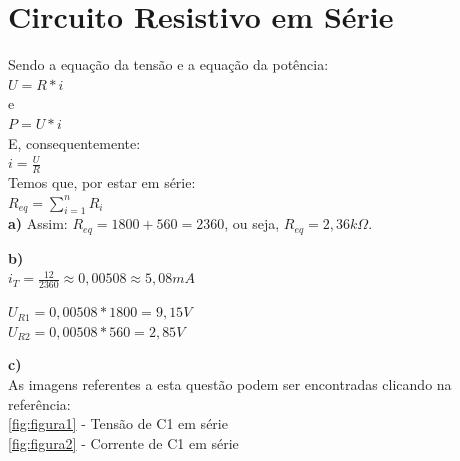 \documentclass[
		12pt, %
		oneside, %
		a4paper, %
		article, %
		chapter=TITLE, %
		section=TITLE, %
		subsection=TITLE, %
		english, %
		spanish, %
		brazil %
]{abntex2} %
\numberwithin{equation}{section}
\numberwithin{figure}{section}
\numberwithin{table}{section}
\begin{document}

	\frenchspacing %



	\imprimircapa

	\imprimirfolhaderosto* %

	\textual

	\chapter{Circuito Resistivo em Série}

	\flushleft
	Sendo a equação da tensão e a equação da potência: \\
	\center
	$U = R*i$ \\
	e \\
	$P = U*i$ \\
	\flushleft
	E, consequentemente: \\
	\center
	$i = \frac{U}{R}$ \\
	\flushleft
	Temos que, por estar em série: \\
	\center
	$R_{eq} = \sum_{i=1}^{n} R_i$ \\


	\flushleft
	\textbf{a)} Assim: $R_{eq} = 1800 + 560 = 2360$, ou seja, $R_{eq} = 2,36 k\Omega$.
	\linebreak

	\textbf{b)} \\
	$i_T = \frac{12}{2360} \approx 0,00508  \approx 5,08 mA$

	$U_{R1} = 0,00508 * 1800 = 9,15V$ \\
	$U_{R2} = 0,00508 * 560 = 2,85V$
	\linebreak

	\textbf{c)} \\
	As imagens referentes a esta questão podem ser encontradas clicando na referência: \\
	\ref{fig:figura1} - Tensão de C1 em série \\
	\ref{fig:figura2} - Corrente de C1 em série
	\linebreak
\end{document}
